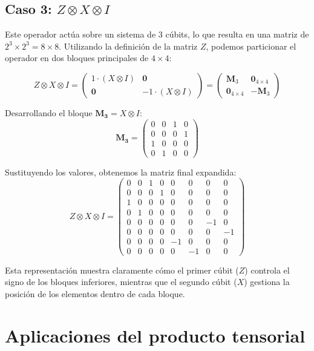\documentclass[11pt,a4paper,spanish]{book}
\begin{document}
\subsection{Caso 3: $Z \otimes X \otimes I$}
Este operador actúa sobre un sistema de 3 cúbits, lo que resulta en una matriz de $2^3 \times 2^3 = 8 \times 8$. Utilizando la definición de la matriz $Z$, podemos particionar el operador en dos bloques principales de $4 \times 4$:

\[ 
Z \otimes X \otimes I = \begin{pmatrix} 1 \cdot (X \otimes I) & \mathbf{0} \\ \mathbf{0} & -1 \cdot (X \otimes I) \end{pmatrix} = 
\begin{pmatrix} 
\mathbf{M}_3 & \mathbf{0}_{4 \times 4} \\
\mathbf{0}_{4 \times 4} & -\mathbf{M}_3
\end{pmatrix}
\]

Desarrollando el bloque $\mathbf{M_3} = X \otimes I$:
\[
\mathbf{M_3} = \begin{pmatrix} 0 & 0 & 1 & 0 \\ 0 & 0 & 0 & 1 \\ 1 & 0 & 0 & 0 \\ 0 & 1 & 0 & 0 \end{pmatrix}
\]

Sustituyendo los valores, obtenemos la matriz final expandida:
\[ 
Z \otimes X \otimes I = 
\begin{pmatrix} 
0 & 0 & 1 & 0 & 0 & 0 & 0 & 0 \\
0 & 0 & 0 & 1 & 0 & 0 & 0 & 0 \\
1 & 0 & 0 & 0 & 0 & 0 & 0 & 0 \\
0 & 1 & 0 & 0 & 0 & 0 & 0 & 0 \\
0 & 0 & 0 & 0 & 0 & 0 & -1 & 0 \\
0 & 0 & 0 & 0 & 0 & 0 & 0 & -1 \\
0 & 0 & 0 & 0 & -1 & 0 & 0 & 0 \\
0 & 0 & 0 & 0 & 0 & -1 & 0 & 0 
\end{pmatrix} 
\]

Esta representación muestra claramente cómo el primer cúbit ($Z$) controla el signo de los bloques inferiores, mientras que el segundo cúbit ($X$) gestiona la posición de los elementos dentro de cada bloque. 

\section{Aplicaciones del producto tensorial}
\end{document}
